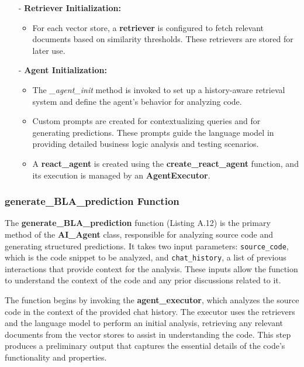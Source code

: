 \begin{itemize}
    \item[-] \textbf{Retriever Initialization:}
    \begin{itemize}
        \item For each vector store, a \textbf{retriever} is configured to fetch relevant documents based on similarity thresholds. These retrievers are stored for later use.
    \end{itemize}

    \item[-] \textbf{Agent Initialization:}
    \begin{itemize}
        \item The \textit{\_agent\_init} method is invoked to set up a history-aware retrieval system and define the agent's behavior for analyzing code.
        \item Custom prompts are created for contextualizing queries and for generating predictions. These prompts guide the language model in providing detailed business logic analysis and testing scenarios.
        \item A \textbf{react\_agent} is created using the \textbf{create\_react\_agent} function, and its execution is managed by an \textbf{AgentExecutor}.
    \end{itemize}
\end{itemize}

\subsubsection{generate\_BLA\_prediction Function}

The \textbf{generate\_BLA\_prediction} function (Listing A.12) is the primary method of the \textbf{AI\_Agent} class, responsible for analyzing source code and generating structured predictions. It takes two input parameters: \texttt{source\_code}, which is the code snippet to be analyzed, and \texttt{chat\_history}, a list of previous interactions that provide context for the analysis. These inputs allow the function to understand the context of the code and any prior discussions related to it.

The function begins by invoking the \textbf{agent\_executor}, which analyzes the source code in the context of the provided chat history. The executor uses the retrievers and the language model to perform an initial analysis, retrieving any relevant documents from the vector stores to assist in understanding the code. This step produces a preliminary output that captures the essential details of the code's functionality and properties.


